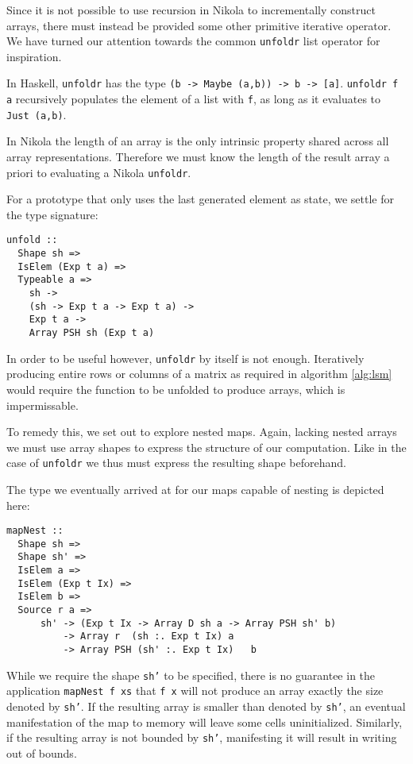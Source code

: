 Since it is not possible to use recursion in Nikola to incrementally construct
arrays, there must instead be provided some other primitive iterative operator.
We have turned our attention towards the common \texttt{unfoldr} list operator
for inspiration.

In Haskell, \texttt{unfoldr} has the type \texttt{(b -> Maybe (a,b)) -> b ->
[a]}.  \texttt{unfoldr f a} recursively populates the element of a list with
\texttt{f}, as long as it evaluates to \texttt{Just (a,b)}.

In Nikola the length of an array is the only intrinsic property shared across
all array representations. Therefore we must know the length of the result array a
priori to evaluating a Nikola \texttt{unfoldr}.

For a prototype that only uses the last generated element as state, we settle
for the type signature:
\begin{verbatim}
unfold ::
  Shape sh =>
  IsElem (Exp t a) =>
  Typeable a =>
    sh ->
    (sh -> Exp t a -> Exp t a) ->
    Exp t a ->
    Array PSH sh (Exp t a)
\end{verbatim}

In order to be useful however, \texttt{unfoldr} by itself is not enough.
Iteratively producing entire rows or columns of a matrix as required in
algorithm \ref{alg:lsm} would require the function to be unfolded to produce
arrays, which is impermissable.

To remedy this, we set out to explore nested maps. Again, lacking nested arrays
we must use array shapes to express the structure of our computation.  Like in
the case of \texttt{unfoldr} we thus must express the resulting shape beforehand.

The type we eventually arrived at for our maps capable of nesting is depicted
here:
\begin{verbatim}
mapNest ::
  Shape sh =>
  Shape sh' =>
  IsElem a =>
  IsElem (Exp t Ix) =>
  IsElem b =>
  Source r a =>
      sh' -> (Exp t Ix -> Array D sh a -> Array PSH sh' b)
          -> Array r  (sh :. Exp t Ix) a
          -> Array PSH (sh' :. Exp t Ix)   b
\end{verbatim}

While we require the shape \texttt{sh'} to be specified, there is no guarantee
in the application \texttt{mapNest f xs} that \texttt{f x} will not produce an
array exactly the size denoted by \texttt{sh'}. If the resulting array is
smaller than denoted by \texttt{sh'}, an eventual manifestation of the map to
memory will leave some cells uninitialized. Similarly, if the resulting array
is not bounded by \texttt{sh'}, manifesting it will result in writing out of
bounds.

